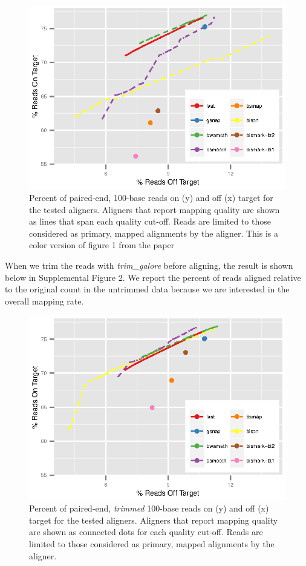 \documentclass[12pt]{article}
\begin{document}
\begin{figure}[H]%
    \centerline{\includegraphics[width=125mm]{real-quals.eps}}
    \caption{Percent of paired-end, 100-base reads on (y) and off (x) target for
    the tested aligners. Aligners that report mapping quality are shown as lines
that span each quality cut-off. Reads are limited to those considered as primary, mapped alignments by the aligner. This is a color version of figure 1 from the paper}\label{suppfig:01}
\end{figure}

When we trim the reads with \emph{trim\_galore} before aligning, the result is shown below in Supplemental Figure 2. We report the percent of reads aligned relative
to the original count in the untrimmed data because we are interested in the
overall mapping rate.

\begin{figure}[H]%
    \centerline{\includegraphics[width=125mm]{real-trim-quals.eps}}
    \caption{Percent of paired-end, \emph{trimmed} 100-base reads on (y) and off (x) target for the tested aligners. Aligners that report mapping quality are shown as connected dots for each quality cut-off. Reads are limited to those considered as primary, mapped alignments by the aligner.}\label{suppfig:02}
\end{figure}
\end{document}

